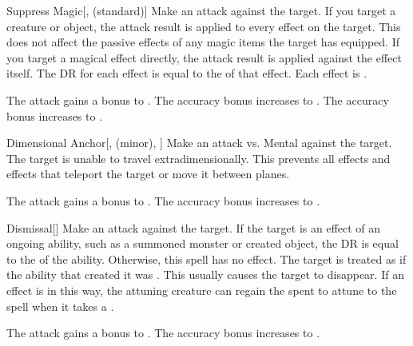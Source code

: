 \lowercase{\hypertarget{spell:Suppress Magic}{}}\label{spell:Suppress Magic}
\begin{freeability}[Rank 1]{\hypertarget{spell:Suppress Magic}{Suppress Magic}}[,  (standard)]
Make an attack against the target.
If you target a creature or object, the attack result is applied to every  effect on the target.
This does not affect the passive effects of any magic items the target has equipped.
If you target a magical effect directly, the attack result is applied against the effect itself.
The DR for each effect is equal to the  of that effect.
\hit Each effect is .

\rankline
{} The attack gains a  bonus to .
 The accuracy bonus increases to .
 The accuracy bonus increases to .
\end{freeability}
\vspace{0.25em}



\lowercase{\hypertarget{spell:Dimensional Anchor}{}}\label{spell:Dimensional Anchor}
\begin{freeability}[Rank 3]{\hypertarget{spell:Dimensional Anchor}{Dimensional Anchor}}[,  (minor), ]
Make an attack vs. Mental against the target.
\hit The target is unable to travel extradimensionally.
This prevents all  effects and effects that teleport the target or move it between planes.

\rankline
{} The attack gains a  bonus to .
 The accuracy bonus increases to .
\end{freeability}
\vspace{0.25em}



\lowercase{\hypertarget{spell:Dismissal}{}}\label{spell:Dismissal}
\begin{freeability}[Rank 3]{\hypertarget{spell:Dismissal}{Dismissal}}[]
Make an attack against the target.
If the target is an effect of an ongoing  ability, such as a summoned monster or created object, the DR is equal to the  of the ability.
Otherwise, this spell has no effect.
\hit The target is treated as if the ability that created it was .
This usually causes the target to disappear.
If an  effect is  in this way,
the attuning creature can regain the  spent to attune to the spell when it takes a .

\rankline
{} The attack gains a  bonus to .
 The accuracy bonus increases to .
\end{freeability}
\vspace{0.25em}



